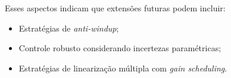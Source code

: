 Esses aspectos indicam que extensões futuras podem incluir:

\begin{itemize}
    \item Estratégias de \textit{anti-windup};
    \item Controle robusto considerando incertezas paramétricas;
    \item Estratégias de linearização múltipla com \textit{gain scheduling}.
\end{itemize}

